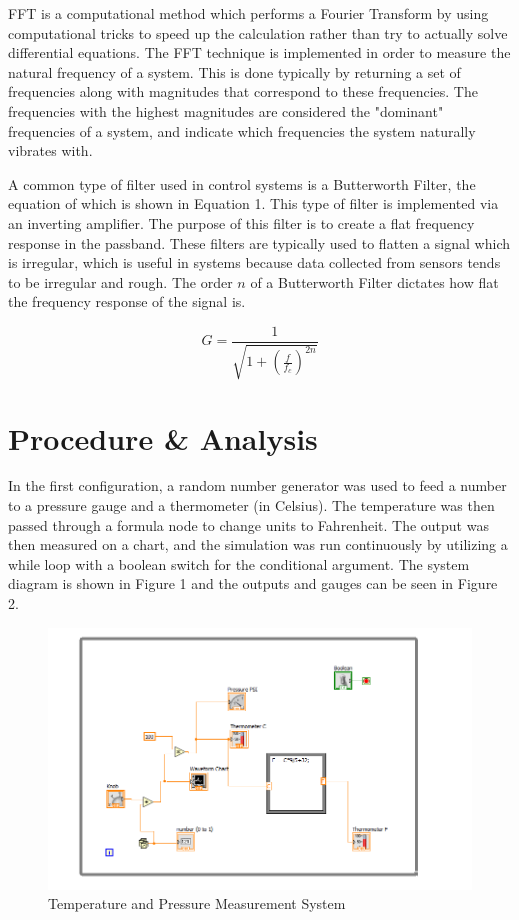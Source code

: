 \documentclass[12pt]{article}
\begin{document}
FFT is a computational method which performs a Fourier Transform by using computational tricks to speed up the calculation rather than try to actually solve differential equations. The FFT technique is implemented in order to measure the natural frequency of a system. This is done typically by returning a set of frequencies along with magnitudes that correspond to these frequencies. The frequencies with the highest magnitudes are considered the "dominant" frequencies of a system, and indicate which frequencies the system naturally vibrates with.
\bigskip

A common type of filter used in control systems is a Butterworth Filter, the equation of which is shown in Equation 1. This type of filter is implemented via an inverting amplifier. The purpose of this filter is to create a flat frequency response in the passband. These filters are typically used to flatten a signal which is irregular, which is useful in systems because data collected from sensors tends to be irregular and rough. The order $n$ of a Butterworth Filter dictates how flat the frequency response of the signal is.
\bigskip

\begin{equation}
G = \frac{1}{\sqrt{1 + (\frac{f}{f_{c}})^{2n}}}
\end{equation}
\bigskip


\section*{\fontsize{12}{12}\selectfont \large Procedure \& Analysis}
In the first configuration, a random number generator was used to feed a number to a pressure gauge and a thermometer (in Celsius). The temperature was then passed through a formula node to change units to Fahrenheit. The output was then measured on a chart, and the simulation was run continuously by utilizing a while loop with a boolean switch for the conditional argument. The system diagram is shown in Figure 1 and the outputs and gauges can be seen in Figure 2.
\bigskip

\newpage

\begin{figure}[h!] %
   \centering
   \includegraphics[width=\linewidth]{lab_4a.PNG} 
   \caption{Temperature and Pressure Measurement System}
   \label{fig:example}
\end{figure}
\end{document}
